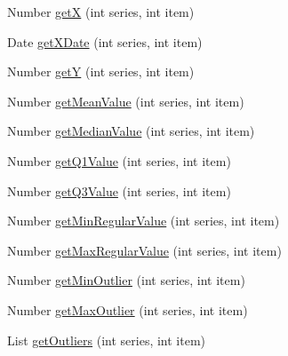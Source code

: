 \begin{DoxyCompactItemize}
\item 
Number \mbox{\hyperlink{classorg_1_1jfree_1_1data_1_1statistics_1_1_default_box_and_whisker_x_y_dataset_a2883ae1f7436e49fba834c2e14f039a7}{getX}} (int series, int item)
\item 
Date \mbox{\hyperlink{classorg_1_1jfree_1_1data_1_1statistics_1_1_default_box_and_whisker_x_y_dataset_a4ce592cbf0965836deeb816be6e24405}{get\+X\+Date}} (int series, int item)
\item 
Number \mbox{\hyperlink{classorg_1_1jfree_1_1data_1_1statistics_1_1_default_box_and_whisker_x_y_dataset_a6b5b403d1094947c415cbea649904128}{getY}} (int series, int item)
\item 
Number \mbox{\hyperlink{classorg_1_1jfree_1_1data_1_1statistics_1_1_default_box_and_whisker_x_y_dataset_a304903af30ed69f64ecad290fbfef916}{get\+Mean\+Value}} (int series, int item)
\item 
Number \mbox{\hyperlink{classorg_1_1jfree_1_1data_1_1statistics_1_1_default_box_and_whisker_x_y_dataset_abae40a79cd11132e2fbc3a6f708a654b}{get\+Median\+Value}} (int series, int item)
\item 
Number \mbox{\hyperlink{classorg_1_1jfree_1_1data_1_1statistics_1_1_default_box_and_whisker_x_y_dataset_acc9e0188091c4431574b0da61d5e2311}{get\+Q1\+Value}} (int series, int item)
\item 
Number \mbox{\hyperlink{classorg_1_1jfree_1_1data_1_1statistics_1_1_default_box_and_whisker_x_y_dataset_a02e36cd7245601a5bb665c36f953a27a}{get\+Q3\+Value}} (int series, int item)
\item 
Number \mbox{\hyperlink{classorg_1_1jfree_1_1data_1_1statistics_1_1_default_box_and_whisker_x_y_dataset_a7104c413a84e5908e40bfa42d931d965}{get\+Min\+Regular\+Value}} (int series, int item)
\item 
Number \mbox{\hyperlink{classorg_1_1jfree_1_1data_1_1statistics_1_1_default_box_and_whisker_x_y_dataset_a67ab411220452537047ac852330bd0c0}{get\+Max\+Regular\+Value}} (int series, int item)
\item 
Number \mbox{\hyperlink{classorg_1_1jfree_1_1data_1_1statistics_1_1_default_box_and_whisker_x_y_dataset_a0bf29647538b91763c23cb07f6aadf6c}{get\+Min\+Outlier}} (int series, int item)
\item 
Number \mbox{\hyperlink{classorg_1_1jfree_1_1data_1_1statistics_1_1_default_box_and_whisker_x_y_dataset_a3bf4cfe81f62aa7bcea3b0abf9e045d3}{get\+Max\+Outlier}} (int series, int item)
\item 
List \mbox{\hyperlink{classorg_1_1jfree_1_1data_1_1statistics_1_1_default_box_and_whisker_x_y_dataset_af17fd8f346542c9633d159bdcc543f57}{get\+Outliers}} (int series, int item)

\end{DoxyCompactItemize}
